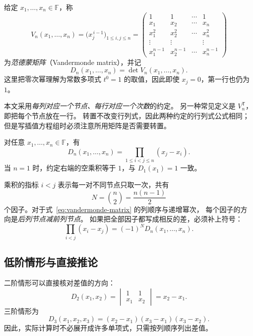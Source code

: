 \documentclass[UTF8,12pt,a4paper,fontset=fandol]{ctexart}
\begin{document}
\begin{definition}[范德蒙矩阵与范德蒙行列式]
\label{def:vandermonde}
给定 $x_1,\ldots,x_n\in\mathbb F$，称
\begin{equation}
  V_n(x_1,\ldots,x_n)
  =\bigl(x_j^{\,i-1}\bigr)_{1\leq i,j\leq n}
  =\begin{pmatrix}
    1&1&\cdots&1\\
    x_1&x_2&\cdots&x_n\\
    x_1^2&x_2^2&\cdots&x_n^2\\
    \vdots&\vdots&&\vdots\\
    x_1^{n-1}&x_2^{n-1}&\cdots&x_n^{n-1}
  \end{pmatrix}
  \label{eq:vandermonde-matrix}
\end{equation}
为\emph{范德蒙矩阵}（Vandermonde matrix），并记
\[
  D_n(x_1,\ldots,x_n)=\det V_n(x_1,\ldots,x_n).
\]
这里把零次幂理解为常数多项式 $t^0=1$ 的取值，因此即使 $x_j=0$，第一行也仍为 $1$。
\end{definition}

本文采用\emph{每列对应一个节点、每行对应一个次数}的约定。
另一种常见定义是 $V_n^{\mathsf T}$，即把每个节点放在一行。
转置不改变行列式，因此两种约定的行列式公式相同；
但是写插值方程组时必须注意所用矩阵是否需要转置。

\begin{theorem}[范德蒙行列式公式]
\label{thm:vandermonde}
对任意 $x_1,\ldots,x_n\in\mathbb F$，有
\begin{equation}
  D_n(x_1,\ldots,x_n)
  =\prod_{1\leq i<j\leq n}(x_j-x_i).
  \label{eq:vandermonde-product}
\end{equation}
当 $n=1$ 时，约定右端的空乘积等于 $1$，与 $D_1(x_1)=1$ 一致。
\end{theorem}

乘积的指标 $i<j$ 表示每一对不同节点只取一次，共有
\[
  N=\binom n2=\frac{n(n-1)}2
\]
个因子。对于式~\eqref{eq:vandermonde-matrix} 的列顺序与递增幂次，
每个因子的方向是\emph{后列节点减前列节点}。
如果把全部因子都写成相反的差，必须补上符号：
\begin{equation}
  \prod_{i<j}(x_i-x_j)=(-1)^N D_n(x_1,\ldots,x_n).
  \label{eq:reversed-differences}
\end{equation}

\subsection{低阶情形与直接推论}

二阶情形可以直接核对差值的方向：
\[
  D_2(x_1,x_2)=\begin{vmatrix}1&1\\x_1&x_2\end{vmatrix}=x_2-x_1.
\]
三阶情形为
\[
  D_3(x_1,x_2,x_3)
  =(x_2-x_1)(x_3-x_1)(x_3-x_2).
\]
因此，实际计算时不必展开成许多单项式，只需按列顺序列出差值。
\end{document}

